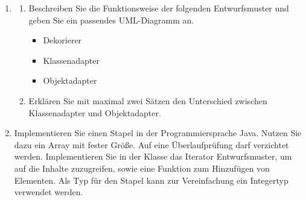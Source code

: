 \documentclass{lehramt-informatik}
\begin{document}
\begin{enumerate}


\item

\begin{enumerate}


\item Beschreiben Sie die Funktionsweise der folgenden Entwurfsmuster
und geben Sie ein passendes UML-Diagramm an.

\begin{itemize}
\item Dekorierer
\item Klassenadapter
\item Objektadapter
\end{itemize}


\item Erklären Sie mit maximal zwei Sätzen den Unterschied zwischen
Klassenadapter und Objektadapter.
\end{enumerate}


\item Implementieren Sie einen Stapel in der Programmiersprache Java.
Nutzen Sie dazu ein Array mit fester Größe. Auf eine Überlaufprüfung
darf verzichtet werden. Implementieren Sie in der Klasse das Iterator
Entwurfsmuster, um auf die Inhalte zuzugreifen, sowie eine Funktion zum
Hinzufügen von Elementen. Als Typ für den Stapel kann zur Vereinfachung
ein Integertyp verwendet werden.
\end{enumerate}
\end{document}
